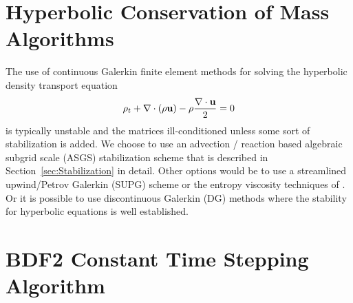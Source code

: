 \documentclass[letterpaper]{erdc}
\begin{document}
%



%
%
%
\section{Hyperbolic Conservation of Mass Algorithms}\label{sec:ConservationOfMassNumericalApproach}
The use of continuous Galerkin finite element methods for solving the hyperbolic density transport equation
\begin{equation}
  \rho_t + \nabla\cdot(\rho\textbf{u}) - \rho\frac{\nabla\cdot\textbf{u}}{2} = 0
\end{equation}
is typically unstable and the matrices ill-conditioned unless some sort of stabilization is added.  We choose to use an advection / reaction based algebraic subgrid scale (ASGS) stabilization scheme that is described in Section~\ref{sec:Stabilization} in detail.  Other options would be to use a streamlined upwind/Petrov Galerkin (SUPG) scheme or the entropy viscosity techniques of \cite{guermond2011entropy}.  Or it is possible to use discontinuous Galerkin (DG) methods where the stability for hyperbolic equations is well established.



%
%
%
\section{BDF2 Constant Time Stepping Algorithm}\label{sec:BDF2ConstantTimeSteppingAlgorithm}
\end{document}
